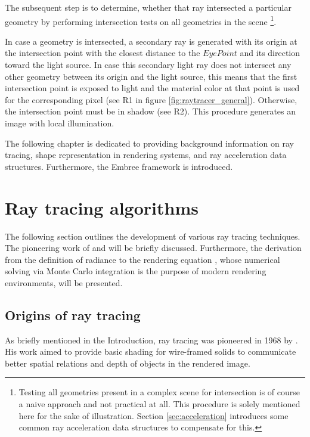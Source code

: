 The subsequent step is to determine, whether that ray intersected a particular geometry by performing intersection tests on all geometries in the scene \footnote{Testing all geometries present in a complex scene for intersection is of course a naive approach and not practical at all. This procedure is solely mentioned here for the sake of illustration. Section \ref{sec:acceleration} introduces some common ray acceleration data structures to compensate for this.}. 

In case a geometry is intersected, a secondary ray is generated with its origin at the intersection point with the closest distance to the $Eye Point$ and its direction toward the light source. In case this secondary light ray does not intersect any other geometry between its origin and the light source, this means that the first intersection point is exposed to light and the material color at that point is used for the corresponding pixel (see R1 in figure \ref{fig:raytracer_general}). Otherwise, the intersection point must be in shadow (see R2). This procedure generates an image with local illumination.

The following chapter is dedicated to providing background information on ray tracing, shape representation in rendering systems, and ray acceleration data structures. Furthermore, the Embree framework is introduced.

\section{Ray tracing algorithms}

The following section outlines the development of various ray tracing techniques. The pioneering work of \cite{appel1968some} and \cite{whitted1979improved} will be briefly discussed. Furthermore, the derivation from the definition of radiance to the rendering equation \cite{kajiya1986rendering}, whose numerical solving via Monte Carlo integration is the purpose of modern rendering environments, will be presented.

\subsection{Origins of ray tracing}
As briefly mentioned in the Introduction, ray tracing was pioneered in 1968 by \cite{appel1968some}. His work aimed to provide basic shading for wire-framed solids to communicate better spatial relations and depth of objects in the rendered image.

